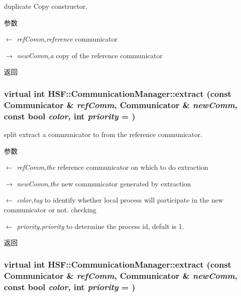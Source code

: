 duplicate Copy constructor. 
\begin{DoxyParams}{参数}
\item[\mbox{$\leftarrow$} {\em refComm,reference}]communicator \item[\mbox{$\rightarrow$} {\em newComm,a}]copy of the reference communicator \end{DoxyParams}
\begin{DoxyReturn}{返回}

\end{DoxyReturn}
\hypertarget{classHSF_1_1CommunicationManager_ae872cf2b678e8998fcb7b7dcc1a9b2d0}{
\subsubsection[{extract}]{\setlength{\rightskip}{0pt plus 5cm}virtual int HSF::CommunicationManager::extract (const {\bf Communicator} \& {\em refComm}, \/  {\bf Communicator} \& {\em newComm}, \/  const bool {\em color}, \/  int {\em priority} = {})}}
\label{classHSF_1_1CommunicationManager_ae872cf2b678e8998fcb7b7dcc1a9b2d0}


split extract a communicator to from the reference communicator. 
\begin{DoxyParams}{参数}
\item[\mbox{$\leftarrow$} {\em refComm,the}]reference communicator on which to do extraction \item[\mbox{$\rightarrow$} {\em newComm,the}]new communicator generated by extraction \item[\mbox{$\leftarrow$} {\em color,tag}]to identify whether local process will participate in the new communicator or not. checking \item[\mbox{$\leftarrow$} {\em priority,priority}]to determine the process id, defult is 1. \end{DoxyParams}
\begin{DoxyReturn}{返回}

\end{DoxyReturn}
\hypertarget{classHSF_1_1CommunicationManager_ae872cf2b678e8998fcb7b7dcc1a9b2d0}{
\subsubsection[{extract}]{\setlength{\rightskip}{0pt plus 5cm}virtual int HSF::CommunicationManager::extract (const {\bf Communicator} \& {\em refComm}, \/  {\bf Communicator} \& {\em newComm}, \/  const bool {\em color}, \/  int {\em priority} = {})}}
\label{classHSF_1_1CommunicationManager_ae872cf2b678e8998fcb7b7dcc1a9b2d0}


